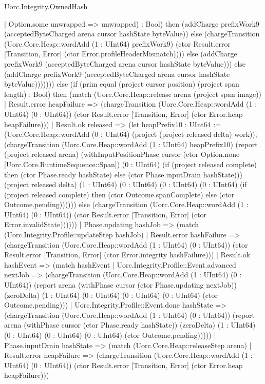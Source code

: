 \begin{lexlean}{Uorc.Integrity.OwnedHash}
\begin{semanticmodule}
{            | Option.some unwrapped => unwrapped) : Bool) then (addCharge prefixWork9 (acceptedByteCharged arena cursor hashState byteValue)) else (chargeTransition (Uorc.Core.Heap::wordAdd (1 : UInt64) prefixWork9) (ctor Result.error [Transition, Error] (ctor Error.profileHeaderMismatch)))) else (addCharge prefixWork9 (acceptedByteCharged arena cursor hashState byteValue))) else (addCharge prefixWork9 (acceptedByteCharged arena cursor hashState byteValue))))))) else (if (prim equal (project cursor position) (project span length) : Bool) then (match (Uorc.Core.Heap::release arena (project span image))
        | Result.error heapFailure => (chargeTransition (Uorc.Core.Heap::wordAdd (1 : UInt64) (0 : UInt64)) (ctor Result.error [Transition, Error] (ctor Error.heap heapFailure)))
        | Result.ok released => (let heapPrefix10 : UInt64 := (Uorc.Core.Heap::wordAdd (0 : UInt64) (project (project released delta) work)); (chargeTransition (Uorc.Core.Heap::wordAdd (1 : UInt64) heapPrefix10) (report (project released arena) (withInputPositionPhase cursor (ctor Option.none [Uorc.Core.RuntimeSequence::Span]) (0 : UInt64) (if (project released complete) then (ctor Phase.ready hashState) else (ctor Phase.inputDrain hashState))) (project released delta) (1 : UInt64) (0 : UInt64) (0 : UInt64) (0 : UInt64) (if (project released complete) then (ctor Outcome.spanComplete) else (ctor Outcome.pending)))))) else (chargeTransition (Uorc.Core.Heap::wordAdd (1 : UInt64) (0 : UInt64)) (ctor Result.error [Transition, Error] (ctor Error.invalidState))))))
    | Phase.updating hashJob => (match (Uorc.Integrity.Profile::updateStep hashJob)
      | Result.error hashFailure => (chargeTransition (Uorc.Core.Heap::wordAdd (1 : UInt64) (0 : UInt64)) (ctor Result.error [Transition, Error] (ctor Error.integrity hashFailure)))
      | Result.ok hashEvent => (match hashEvent
        | Uorc.Integrity.Profile::Event.advanced nextJob => (chargeTransition (Uorc.Core.Heap::wordAdd (1 : UInt64) (0 : UInt64)) (report arena (withPhase cursor (ctor Phase.updating nextJob)) (zeroDelta) (1 : UInt64) (0 : UInt64) (0 : UInt64) (0 : UInt64) (ctor Outcome.pending)))
        | Uorc.Integrity.Profile::Event.done hashState => (chargeTransition (Uorc.Core.Heap::wordAdd (1 : UInt64) (0 : UInt64)) (report arena (withPhase cursor (ctor Phase.ready hashState)) (zeroDelta) (1 : UInt64) (0 : UInt64) (0 : UInt64) (0 : UInt64) (ctor Outcome.pending)))))
    | Phase.inputDrain hashState => (match (Uorc.Core.Heap::releaseStep arena)
      | Result.error heapFailure => (chargeTransition (Uorc.Core.Heap::wordAdd (1 : UInt64) (0 : UInt64)) (ctor Result.error [Transition, Error] (ctor Error.heap heapFailure)))
}
\end{semanticmodule}
\end{lexlean}
